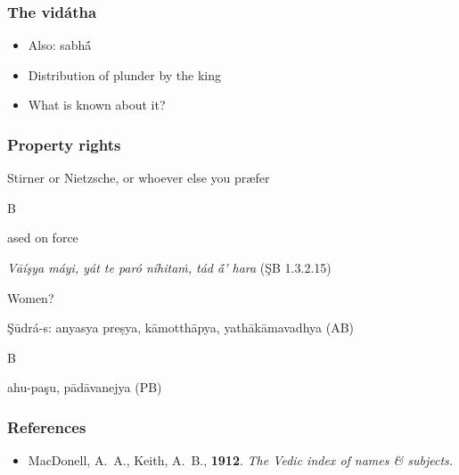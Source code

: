 \documentclass[pdf]{beamer}
\newcommand{\Subitem}[1]{{\setlength\itemindent{12pt} \item[-] #1}}
\begin{document}
\begin{frame} \frametitle{The vidátha}
\begin{itemize}
	\item Also: sabhā́
	\item Distribution of plunder by the king
	\item What is known about it?
\end{itemize}
\end{frame}

\begin{frame} \frametitle{Property rights}
\begin{itemize}
	\item Stirner or Nietzsche, or whoever else you præfer
	\Subitem Based on force
	\item {\textit{Vāíşya máyi, yát te paró níhitaṁ, tád ā́' hara} (ŞB 1.3.2.15)}
	\item Women?
	\item Şūdrá-s: anyasya preṣya, kāmotthāpya, yathākāmavadhya (AB)
	\Subitem Bahu-paşu, pādāvanejya (PB)
\end{itemize}
\end{frame}

\begin{frame} \frametitle{References}
\begin{itemize}
	\item MacDonell, A.~A., Keith, A.~B., \textbf{1912}. \textit{The Vedic index of names \& subjects.}
\end{itemize}
\end{frame}

\end{document}
